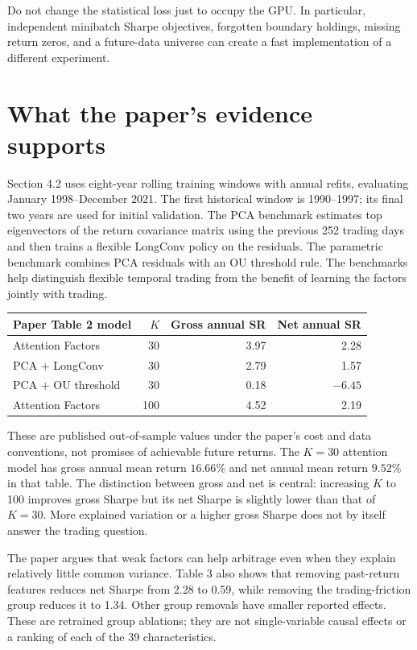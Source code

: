 \documentclass[11pt]{article}
\begin{document}
Do not change the statistical loss just to occupy the GPU. In
particular, independent minibatch Sharpe objectives, forgotten
boundary holdings, missing return zeros, and a future-data universe
can create a fast implementation of a different experiment.

\section{What the paper's evidence supports}
\label{sec:paper-evidence}

Section 4.2 uses eight-year rolling training windows with annual
refits, evaluating January 1998--December 2021. The first historical
window is 1990--1997; its final two years are used for initial
validation. The PCA benchmark estimates top eigenvectors of the
return covariance matrix using the previous 252 trading days and
then trains a flexible LongConv policy on the residuals. The
parametric benchmark combines PCA residuals with an OU threshold
rule. The benchmarks help distinguish flexible temporal trading
from the benefit of learning the factors jointly with trading.

\begin{center}
\small
\begin{tabular}{lrrr}
\toprule
Paper Table 2 model & $K$ & Gross annual SR & Net annual SR\\
\midrule
Attention Factors & 30 & 3.97 & 2.28\\
PCA + LongConv & 30 & 2.79 & 1.57\\
PCA + OU threshold & 30 & 0.18 & $-6.45$\\
Attention Factors & 100 & 4.52 & 2.19\\
\bottomrule
\end{tabular}
\end{center}

These are published out-of-sample values under the paper's cost and
data conventions, not promises of achievable future returns. The
$K=30$ attention model has gross annual mean return $16.66\%$ and
net annual mean return $9.52\%$ in that table. The distinction between
gross and net is central: increasing $K$ to 100 improves gross
Sharpe but its net Sharpe is slightly lower than that of $K=30$.
More explained variation or a higher gross Sharpe does not by itself
answer the trading question.

The paper argues that weak factors can help arbitrage even when
they explain relatively little common variance. Table 3 also shows
that removing past-return features reduces net Sharpe from 2.28 to
0.59, while removing the trading-friction group reduces it to 1.34.
Other group removals have smaller reported effects. These are
retrained group ablations; they are not single-variable causal
effects or a ranking of each of the 39 characteristics.
\end{document}

